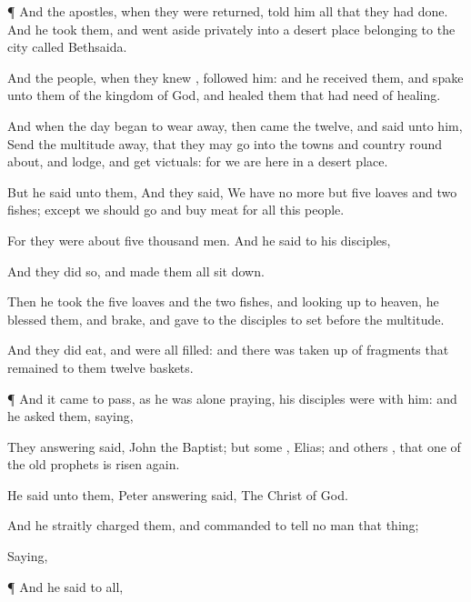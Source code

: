 {\par }{\PP {}¶
And the
apostles, when they were
returned,
told
him all
that they had
done.
And he
took
them, and went
aside
privately
into
a
desert
place belonging to the
city
called
Bethsaida.

And the
people, when they
knew
{},
followed
him:
and he
received
them, and
spake unto
them
of the
kingdom of
God,
and
healed them that
had
need of
healing.

And
when the
day
began to wear
away,
then
came the
twelve, and
said unto
him,
Send the
multitude
away,
that they may
go
into the
towns
and
country round
about, and
lodge,
and
get
victuals:
for we
are
here
in a
desert
place.

But he
said
unto
them,
{}
And they
said,
We
have
no
more
but
five
loaves
and
two
fishes;
except
we should
go and
buy
meat
for
all
this
people.

For they
were
about five
thousand
men.
And he
said
to
his
disciples,
{}

And they
did
so,
and
made them
all sit
down.

Then he
took
the
five
loaves
and
the
two
fishes, and looking
up
to
heaven, he
blessed
them,
and
brake,
and
gave to the
disciples to set
before the
multitude.

And they did
eat,
and
were
all
filled:
and there was taken
up of
fragments that
remained to
them
twelve
baskets.


\par }{\PP {}¶
And it came to
pass,
as
he
was
alone
praying, his
disciples were
with
him:
and he
asked
them,
saying,
{}

They
answering
said,
John the
Baptist;
but
some
{},
Elias;
and
others
{},
that
one of
the
old
prophets is risen
again.

He
said unto
them,
{}
Peter
answering
said, The
Christ of
God.

And he straitly
charged
them, and
commanded
{} to
tell no
man that
thing;

Saying,
{}


\par }{\PP {}¶
And he
said
to
{}
all,
{}

}
